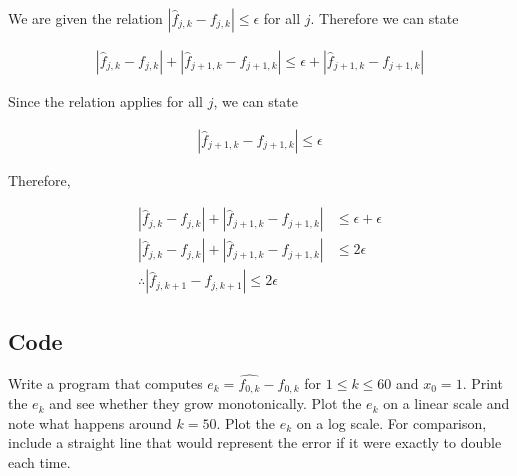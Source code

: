 \documentclass{article}
\begin{document}
		We are given the relation $|\hat{f}_{j,k}-f_{j,k}|\leq\epsilon$ for all $j$.  Therefore we can state 
		
		\begin{equation}
			\begin{split}
			|\hat{f}_{j,k}-f_{j,k}|+|\hat{f}_{j+1,k}-f_{j+1,k}| \leq\epsilon+|\hat{f}_{j+1,k}-f_{j+1,k}|		
			\end{split}
		\end{equation}
		
		Since the relation applies for all $j$, we can state
		
		\begin{equation}
			\begin{split}
			|\hat{f}_{j+1,k}-f_{j+1,k}|\leq\epsilon
			\end{split}
		\end{equation}
		
		Therefore,
		
		\begin{equation}
			\begin{split}
			|\hat{f}_{j,k}-f_{j,k}|+|\hat{f}_{j+1,k}-f_{j+1,k}|&\leq\epsilon+\epsilon\\
			|\hat{f}_{j,k}-f_{j,k}|+|\hat{f}_{j+1,k}-f_{j+1,k}|&\leq2\epsilon\\
			\therefore |\hat{f}_{j,k+1}-f_{j,k+1}| \leq2\epsilon
			\end{split}
		\end{equation}
		
		\subsection{Code}
		Write a program that computes $e_{k}=\hat{f_{0,k}}-f_{0,k}$ for $1\leq k\leq60$ and $x_{0}=1$.  Print the $e_{k}$ and see whether they grow monotonically.  Plot the $e_{k}$ on a linear scale and note what happens around $k=50$.  Plot the $e_{k}$ on a log scale.  For comparison, include a straight line that would represent the error if it were exactly to double each time.
		
\end{document}
